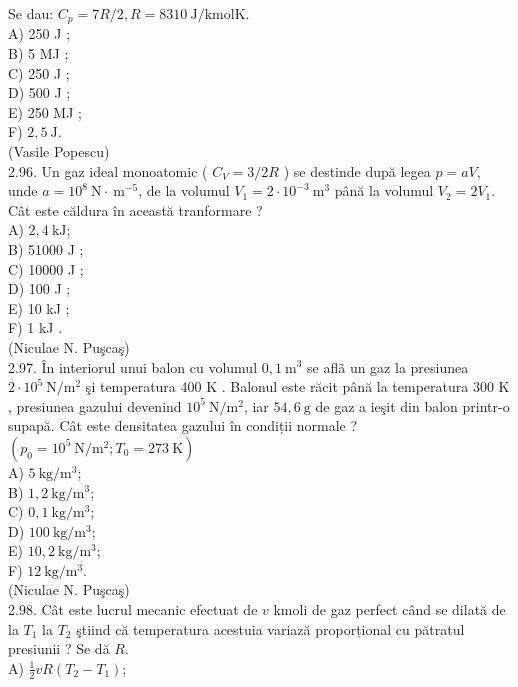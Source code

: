 \documentclass[10pt]{article}
\begin{document}
Se dau: $C_{p}=7 R / 2, R=8310 \mathrm{~J} / \mathrm{kmol} \mathrm{K}$.\\
A) 250 J ;\\
B) 5 MJ ;\\
C) 250 J ;\\
D) 500 J ;\\
E) 250 MJ ;\\
F) $2,5 \mathrm{~J}$.\\
(Vasile Popescu)\\
2.96. Un gaz ideal monoatomic ( $C_{V}=3 / 2 R$ ) se destinde după legea $p=a V$, unde $a=10^{8} \mathrm{~N} \cdot \mathrm{~m}^{-5}$, de la volumul $V_{1}=2 \cdot 10^{-3} \mathrm{~m}^{3}$ până la volumul $V_{2}=2 V_{1}$. Cât este căldura în această tranformare ?\\
A) $2,4 \mathrm{~kJ}$;\\
B) 51000 J ;\\
C) 10000 J ;\\
D) 100 J ;\\
E) 10 kJ ;\\
F) 1 kJ .\\
(Niculae N. Puşcaş)\\
2.97. În interiorul unui balon cu volumul $0,1 \mathrm{~m}^{3}$ se aflã un gaz la presiunea $2 \cdot 10^{5} \mathrm{~N} / \mathrm{m}^{2}$ şi temperatura 400 K . Balonul este răcit până la temperatura 300 K , presiunea gazului devenind $10^{5} \mathrm{~N} / \mathrm{m}^{2}$, iar $54,6 \mathrm{~g}$ de gaz a ieşit din balon printr-o supapă. Cât este densitatea gazului în condiții normale ?\\
$\left(p_{0}=10^{5} \mathrm{~N} / \mathrm{m}^{2} ; T_{0}=273 \mathrm{~K}\right)$\\
A) $5 \mathrm{~kg} / \mathrm{m}^{3}$;\\
B) $1,2 \mathrm{~kg} / \mathrm{m}^{3}$;\\
C) $0,1 \mathrm{~kg} / \mathrm{m}^{3}$;\\
D) $100 \mathrm{~kg} / \mathrm{m}^{3}$;\\
E) $10,2 \mathrm{~kg} / \mathrm{m}^{3}$;\\
F) $12 \mathrm{~kg} / \mathrm{m}^{3}$.\\
(Niculae N. Puşcaş)\\
2.98. Cât este lucrul mecanic efectuat de $v$ kmoli de gaz perfect când se dilată de la $T_{1}$ la $T_{2}$ ştiind că temperatura acestuia variază proporțional cu pătratul presiunii ? Se dă $R$.\\
A) $\frac{1}{2} v R\left(T_{2}-T_{1}\right)$;\\
\end{document}
